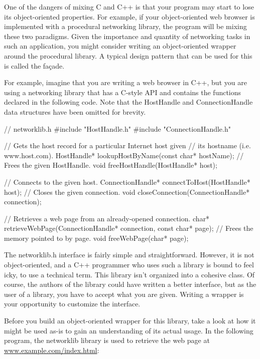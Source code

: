 
One of the dangers of mixing C and C++ is that your program may start to lose its object-oriented properties. For example, if your object-oriented web browser is implemented with a procedural networking library, the program will be mixing these two paradigms. Given the importance and quantity of networking tasks in such an application, you might consider writing an object-oriented wrapper around the procedural library. A typical design pattern that can be used for this is called the façade.

For example, imagine that you are writing a web browser in C++, but you are using a networking library that has a C-style API and contains the functions declared in the following code. Note that the HostHandle and ConnectionHandle data structures have been omitted for brevity.

\begin{cpp}
// networklib.h
#include "HostHandle.h"
#include "ConnectionHandle.h"

// Gets the host record for a particular Internet host given
// its hostname (i.e. www.host.com).
HostHandle* lookupHostByName(const char* hostName);
// Frees the given HostHandle.
void freeHostHandle(HostHandle* host);

// Connects to the given host.
ConnectionHandle* connectToHost(HostHandle* host);
// Closes the given connection.
void closeConnection(ConnectionHandle* connection);

// Retrieves a web page from an already-opened connection.
char* retrieveWebPage(ConnectionHandle* connection, const char* page);
// Frees the memory pointed to by page.
void freeWebPage(char* page);
\end{cpp}

The networklib.h interface is fairly simple and straightforward. However, it is not object-oriented, and a C++ programmer who uses such a library is bound to feel icky, to use a technical term. This library isn’t organized into a cohesive class. Of course, the authors of the library could have written a better interface, but as the user of a library, you have to accept what you are given. Writing a wrapper is your opportunity to customize the interface.

Before you build an object-oriented wrapper for this library, take a look at how it might be used as-is to gain an understanding of its actual usage. In the following program, the networklib library is used to retrieve the web page at \url{www.example.com/index.html}:

